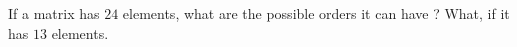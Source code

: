 \begin{flushleft}
If a matrix has $24$ elements, what are the possible orders it can have ? What, if it has $13$ elements.
\end{flushleft} 

